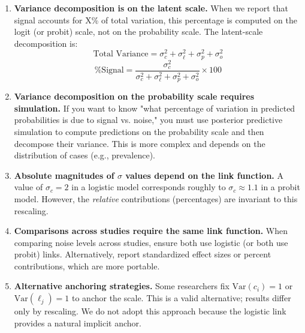\documentclass[num-refs]{wiley-article}
\begin{document}
\begin{enumerate}
    \item \textbf{Variance decomposition is on the latent scale.} When we report that signal accounts for X\% of total variation, this percentage is computed on the logit (or probit) scale, not on the probability scale. The latent-scale decomposition is:
    $$\text{Total Variance} = \sigma_c^2 + \sigma_\ell^2 + \sigma_p^2 + \sigma_o^2$$
    $$\text{\% Signal} = \frac{\sigma_c^2}{\sigma_c^2 + \sigma_\ell^2 + \sigma_p^2 + \sigma_o^2} \times 100$$

    \item \textbf{Variance decomposition on the probability scale requires simulation.} If you want to know "what percentage of variation in predicted probabilities is due to signal vs. noise," you must use posterior predictive simulation to compute predictions on the probability scale and then decompose their variance. This is more complex and depends on the distribution of cases (e.g., prevalence).

    \item \textbf{Absolute magnitudes of $\sigma$ values depend on the link function.} A value of $\sigma_c = 2$ in a logistic model corresponds roughly to $\sigma_c \approx 1.1$ in a probit model. However, the \textit{relative} contributions (percentages) are invariant to this rescaling.

    \item \textbf{Comparisons across studies require the same link function.} When comparing noise levels across studies, ensure both use logistic (or both use probit) links. Alternatively, report standardized effect sizes or percent contributions, which are more portable.

    \item \textbf{Alternative anchoring strategies.} Some researchers fix $\text{Var}(c_i) = 1$ or $\text{Var}(\ell_j) = 1$ to anchor the scale. This is a valid alternative; results differ only by rescaling. We do not adopt this approach because the logistic link provides a natural implicit anchor.
\end{enumerate}

\end{document}
